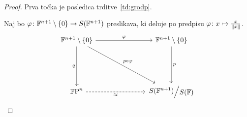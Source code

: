 \begin{proof}
Prva točka je posledica trditve~\ref{td:grodp}.

Naj bo $\varphi \colon \mathbb{F}^{n+1} \setminus \left\{0\right\} \to S(\mathbb{F}^{n+1})$
preslikava, ki deluje po predpisu
$\varphi \colon x \mapsto \frac{x}{\left\lVert x\right\rVert}$.
\[
\begin{tikzcd}[column sep=large, row sep=large]
\F^{n+1} \setminus \set{0}
\arrow[rr, "\varphi"]
\arrow[dd, "q"']
\arrow[ddrr, "p \circ \varphi"]
&& \F^{n+1} \setminus \set{0}
\arrow[dd, "p"] \\\\
\proj{\F}{n} \arrow[rr, dashrightarrow, "\approx"']
&& \kvoc{S(\F^{n+1})}{S(\F)}
\end{tikzcd}
\]
\end{proof}
